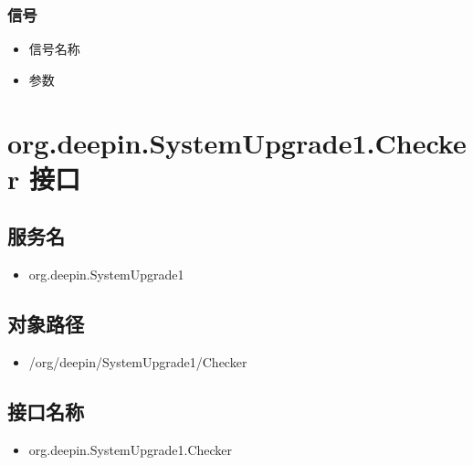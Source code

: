 \documentclass{utart}
\begin{document}
\subsubsection{信号}
\begin{itemize}
    \item 信号名称
    \item 参数
\end{itemize}

\section{org.deepin.SystemUpgrade1.Checker 接口}
\subsection{服务名}
\begin{itemize}
    \item org.deepin.SystemUpgrade1
\end{itemize}

\subsection{对象路径}
\begin{itemize}
    \item /org/deepin/SystemUpgrade1/Checker
\end{itemize}

\subsection{接口名称}
\begin{itemize}
    \item org.deepin.SystemUpgrade1.Checker
\end{itemize}
\end{document}
